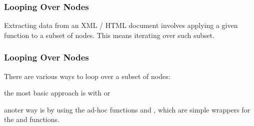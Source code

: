 \documentclass[12pt]{beamer}\usepackage[]{graphicx}\usepackage[]{color}
\begin{document}

\begin{frame}[fragile]
\frametitle{Looping Over Nodes}

Extracting data from an XML / HTML document involves applying a given function to a subset of nodes. This means iterating over such subset.
\eb

\end{frame}


\begin{frame}[fragile]
\frametitle{Looping Over Nodes}

There are various ways to loop over a subset of nodes:
\bbi
 \item the most basic approach is with  or 
 \item anoter way is by using the ad-hoc functions {\hilit {}} and {\hilit {}}, which are simple wrappers for the  and  functions. 
\ei

\end{frame}

\end{document}

